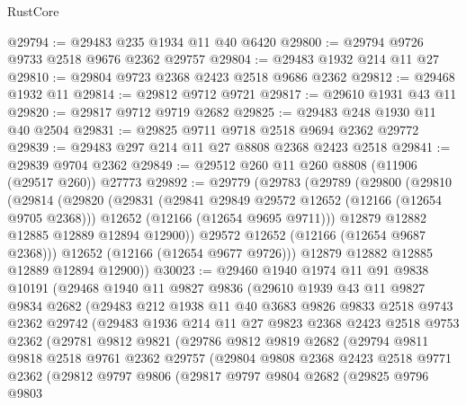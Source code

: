 \begin{lexlean}{RustCore}
\begin{coremodule}
@29794 := @29483 @235 @1934 @11 @40 @6420
@29800 := @29794 @9726 @9733 @2518 @9676 @2362 @29757
@29804 := @29483 @1932 @214 @11 @27
@29810 := @29804 @9723 @2368 @2423 @2518 @9686 @2362
@29812 := @29468 @1932 @11
@29814 := @29812 @9712 @9721
@29817 := @29610 @1931 @43 @11
@29820 := @29817 @9712 @9719 @2682
@29825 := @29483 @248 @1930 @11 @40 @2504
@29831 := @29825 @9711 @9718 @2518 @9694 @2362 @29772
@29839 := @29483 @297 @214 @11 @27 @8808 @2368 @2423 @2518
@29841 := @29839 @9704 @2362
@29849 := @29512 @260 @11 @260 @8808 (@11906 (@29517 @260)) @27773
@29892 := @29779
    (@29783
      (@29789
        (@29800
          (@29810
            (@29814
              (@29820
                (@29831
                  (@29841 @29849 @29572 @12652 (@12166 (@12654 @9705 @2368)))
                  @12652
                  (@12166 (@12654 @9695 @9711)))
                @12879
                @12882
                @12885
                @12889
                @12894
                @12900))
            @29572
            @12652
            (@12166 (@12654 @9687 @2368)))
          @12652
          (@12166 (@12654 @9677 @9726)))
        @12879
        @12882
        @12885
        @12889
        @12894
        @12900))
@30023 := @29460
    @1940
    @1974
    @11
    @91
    @9838
    @10191
    (@29468
      @1940
      @11
      @9827
      @9836
      (@29610
        @1939
        @43
        @11
        @9827
        @9834
        @2682
        (@29483
          @212
          @1938
          @11
          @40
          @3683
          @9826
          @9833
          @2518
          @9743
          @2362
          @29742
          (@29483
            @1936
            @214
            @11
            @27
            @9823
            @2368
            @2423
            @2518
            @9753
            @2362
            (@29781
              @9812
              @9821
              (@29786
                @9812
                @9819
                @2682
                (@29794
                  @9811
                  @9818
                  @2518
                  @9761
                  @2362
                  @29757
                  (@29804
                    @9808
                    @2368
                    @2423
                    @2518
                    @9771
                    @2362
                    (@29812
                      @9797
                      @9806
                      (@29817
                        @9797
                        @9804
                        @2682
                        (@29825
                          @9796
                          @9803

\end{coremodule}
\end{lexlean}
